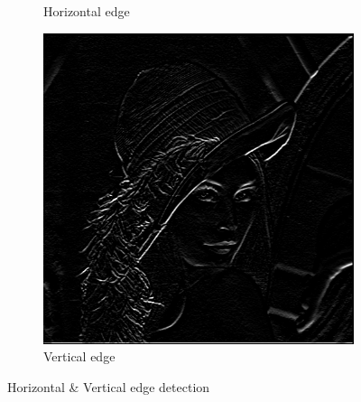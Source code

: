 \documentclass[a4paper,16pt]{article}
\begin{document}
\begin{figure}[h!]
\begin{subfigure}[h!]{0.45\linewidth}
			\caption{Horizontal edge}
		\end{subfigure}
		\hfill
		\centering
		\begin{subfigure}[h!]{0.45\linewidth}
			\includegraphics[width=\linewidth]{vertical}
			\caption{Vertical edge}
		\end{subfigure}%
		\caption{Horizontal \& Vertical edge detection}
	\end{figure}
	\newpage
	
\end{document}
